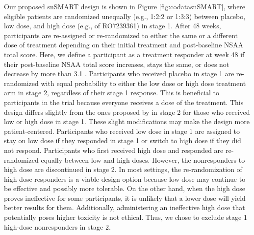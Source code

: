 Our proposed \ac{snSMART} design is shown in Figure \ref{fig:codatasnSMART}, where eligible patients are randomized unequally (e.g., 1:2:2 or 1:3:3) between placebo, low dose, and high dose (e.g., of RO7239361) in stage 1. After 48 weeks, participants are re-assigned or re-randomized to either the same or a different dose of treatment depending on their initial treatment and post-baseline \ac{NSAA} total score. Here, we define a participant as a treatment responder at week 48 if their post-baseline \ac{NSAA} total score increases, stays the same, or does not decrease by more than 3.1 \citep{muntoni2018minimal}. Participants who received placebo in stage 1 are re-randomized with equal probability to either the low dose or high dose treatment arm in stage 2, regardless of their stage 1 response. This is beneficial to participants in the trial because everyone receives a dose of the treatment. This design differs slightly from the ones proposed by \cite{fang2021bayesian, fang2023comparing} in stage 2 for those who received low or high dose in stage 1. These slight modifications may make the design more patient-centered. Participants who received low dose in stage 1 are assigned to stay on low dose if they responded in stage 1 or switch to high dose if they did not respond. Participants who first received high dose and responded are re-randomized equally between low and high doses. However, the nonresponders to high dose are discontinued in stage 2. In most settings, the re-randomization of high dose responders is a viable design option because low dose may continue to be effective and possibly more tolerable. On the other hand, when the high dose proves ineffective for some participants, it is unlikely that a lower dose will yield better results for them. Additionally, administering an ineffective high dose that potentially poses higher toxicity is not ethical. Thus, we chose to exclude stage 1 high-dose nonresponders in stage 2.

